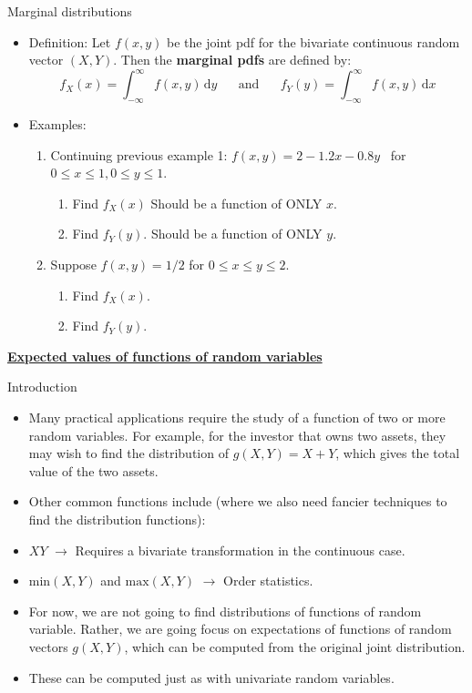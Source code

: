 \documentclass{article}
\newcommand{\bu}[1]{\textbf{\ul{#1}}}				%
\newcommand{\integral}[4]{\displaystyle \int_{#1}^{#2} #3 \,\mathrm{d} #4}		%
\begin{document}
Marginal distributions\bigskip
\begin{itemize}
    \item Definition: Let $f(x,y)$ be the joint pdf for the bivariate continuous random vector $(X, Y)$. Then the \textbf{marginal pdfs} are defined by:
        \[f_X(x) = \integral{-\infty}{\infty}{f(x,y)}{y} \hspace{20pt} \text{and} \hspace{20pt} f_Y(y) = \integral{-\infty}{\infty}{f(x,y)}{x}\]
    \item Examples:
    \begin{enumerate}
        \item Continuing previous example 1: $f(x, y) = 2 - 1.2x - 0.8y$ \, for $0 \le x \le 1, 0 \le y \le 1$.
        \begin{enumerate}
            \item Find $f_X(x)$ \hspace{20pt} Should be a function of ONLY $x$.\vspace{115pt}
            \item Find $f_Y(y)$. \hspace{20pt} Should be a function of ONLY $y$.\vspace{115pt}
        \end{enumerate}
        \item Suppose $f(x, y) = 1/2$ \quad for $0 \le x \le y \le 2$.
        \begin{enumerate}
            \item Find $f_X(x)$.\vspace{115pt}
            \item Find $f_Y(y)$.\vspace{115pt}
        \end{enumerate}
    \end{enumerate}
\end{itemize}\bigskip

\bu{Expected values of functions of random variables}\bigskip

Introduction\bigskip
\begin{itemize}
    \item Many practical applications require the study of a function of two or more random variables. For example, for the investor that owns two assets, they may wish to find the distribution of $g(X,Y) = X + Y$, which gives the total value of the two assets.
    \item Other common functions include (where we also need fancier techniques to find the distribution functions):
    \item[] $XY$ $\rightarrow$ Requires a bivariate transformation in the continuous case.
    \item[] $\text{min}(X,Y)$ and $\text{max}(X,Y)$ $\rightarrow$ Order statistics.
    \item For now, we are not going to find distributions of functions of random variable. Rather, we are going focus on expectations of functions of random vectors $g(X,Y)$, which can be computed from the original joint distribution.
    \item[] These can be computed just as with univariate random variables.
\end{itemize}\bigskip
\end{document}

